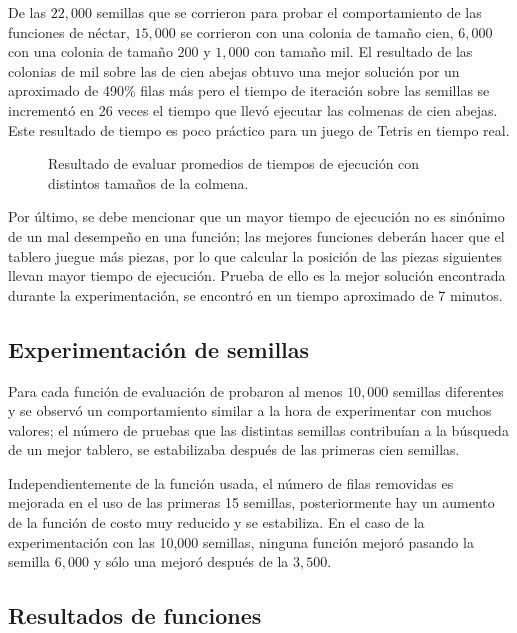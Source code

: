 De las $22,000$ semillas que se corrieron para probar el comportamiento de las 
funciones de néctar, $15,000$ se corrieron con una colonia de 
tamaño cien, $6,000$ con una colonia de tamaño $200$ y $1,000$ con tamaño mil. 
El resultado de las colonias de mil sobre las de cien 
abejas obtuvo una mejor solución por un aproximado de 490\% filas más pero el 
tiempo de iteración sobre las semillas se incrementó en 26 veces el tiempo que llevó 
ejecutar las colmenas de cien abejas. Este resultado de tiempo es 
poco práctico para un juego de Tetris en tiempo real. 
 
 \begin{figure}[h]

\caption[short caption]{Resultado de evaluar promedios de tiempos de ejecución 
con distintos tamaños de la colmena.}
\label{fig:tiempotamanio}
\end{figure} 

Por último, se debe mencionar que un mayor tiempo de ejecución no es sinónimo 
de un mal desempeño en una función; las mejores funciones deberán hacer 
que el tablero juegue más piezas, por lo que calcular la posición de las 
piezas siguientes llevan mayor tiempo de ejecución. Prueba de ello es la mejor solución 
encontrada durante la experimentación, se encontró en un tiempo aproximado de 7 minutos.

\subsection{Experimentación de semillas}

Para cada función de evaluación de probaron al menos $10,000$ semillas diferentes 
y se observó un comportamiento similar a la hora de experimentar con muchos 
valores; el número de pruebas que las distintas semillas contribuían a la 
búsqueda de un mejor tablero, se estabilizaba después de las primeras cien semillas. 

Independientemente de la función usada, el número de filas removidas es mejorada 
en el uso de las primeras 15 semillas, posteriormente hay un aumento de la 
función de costo muy reducido y se estabiliza. En el caso de la experimentación 
con las 10,000 semillas, ninguna función mejoró pasando la semilla $6,000$ y 
sólo una mejoró después de la $3,500$.

\subsection{Resultados de funciones}

